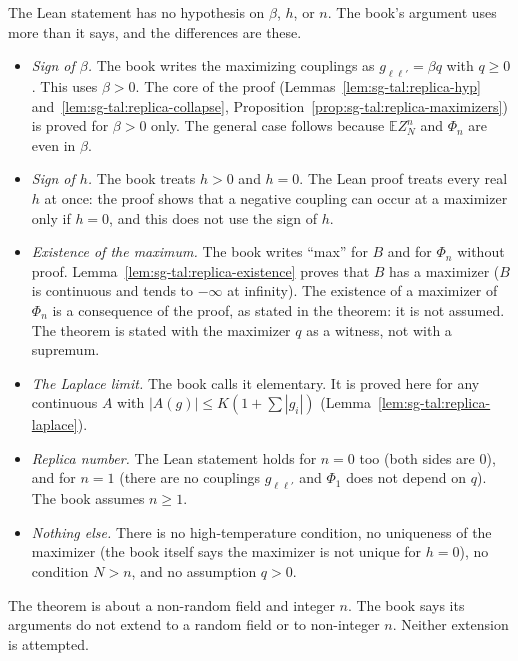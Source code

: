 \begin{remark}\label{rem:sg-tal:replica-hypotheses}
The Lean statement has no hypothesis on $\beta$, $h$, or $n$. The book's argument uses more than it says, and the differences are these.
\begin{itemize}
\item \emph{Sign of $\beta$.} The book writes the maximizing couplings as $g_{\ell\ell'}=\beta q$ with $q\ge0$. This uses $\beta>0$. The core of the proof
 (Lemmas~\ref{lem:sg-tal:replica-hyp} and~\ref{lem:sg-tal:replica-collapse}, Proposition~\ref{prop:sg-tal:replica-maximizers}) is proved for $\beta>0$ only.
 The general case follows because $\mathbb E Z_N^n$ and $\Phi_n$ are even in $\beta$.
\item \emph{Sign of $h$.} The book treats $h>0$ and $h=0$. The Lean proof treats every real $h$ at once: the proof shows that a negative coupling can occur at a maximizer only if $h=0$,
 and this does not use the sign of $h$.
\item \emph{Existence of the maximum.} The book writes ``max'' for $B$ and for $\Phi_n$ without proof. Lemma~\ref{lem:sg-tal:replica-existence} proves that $B$ has a maximizer
 ($B$ is continuous and tends to $-\infty$ at infinity). The existence of a maximizer of $\Phi_n$ is a consequence of the proof, as stated in the theorem: it is not assumed.
 The theorem is stated with the maximizer $q$ as a witness, not with a supremum.
\item \emph{The Laplace limit.} The book calls it elementary. It is proved here for any continuous $A$ with $|A(g)|\le K(1+\sum|g_i|)$ (Lemma~\ref{lem:sg-tal:replica-laplace}).
\item \emph{Replica number.} The Lean statement holds for $n=0$ too (both sides are $0$), and for $n=1$ (there are no couplings $g_{\ell\ell'}$ and $\Phi_1$ does not depend on $q$).
 The book assumes $n\ge1$.
\item \emph{Nothing else.} There is no high-temperature condition, no uniqueness of the maximizer (the book itself says the maximizer is not unique for $h=0$), no condition $N>n$,
 and no assumption $q>0$.
\end{itemize}
The theorem is about a non-random field and integer $n$. The book says its arguments do not extend to a random field or to non-integer $n$. Neither extension is attempted.
\end{remark}

